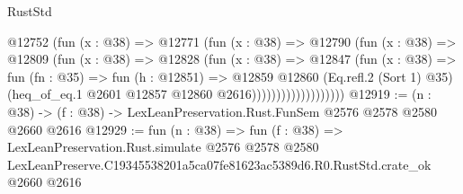 \begin{lexlean}{RustStd}
\begin{coremodule}
                          @12752
                            (fun (x : @38) =>
                            @12771
                              (fun (x : @38) =>
                              @12790
                                (fun (x : @38) =>
                                @12809
                                  (fun (x : @38) =>
                                  @12828
                                    (fun (x : @38) =>
                                    @12847
                                      (fun (x : @38) =>
                                      fun (fn : @35) =>
                                      fun (h : @12851) =>
                                      @12859
                                        @12860
                                        (Eq.refl.{2} (Sort 1) @35)
                                        (heq_of_eq.{1} @2601 @12857 @12860 @2616)))))))))))))))))))
@12919 := (n : @38) -> (f : @38) -> LexLeanPreservation.Rust.FunSem @2576 @2578 @2580 @2660 @2616
@12929 := fun (n : @38) =>
  fun (f : @38) =>
  LexLeanPreservation.Rust.simulate
    @2576
    @2578
    @2580
    LexLeanPreserve.C19345538201a5ca07fe81623ac5389d6.R0.RustStd.crate_ok
    @2660
    @2616
\end{coremodule}
\end{lexlean}

